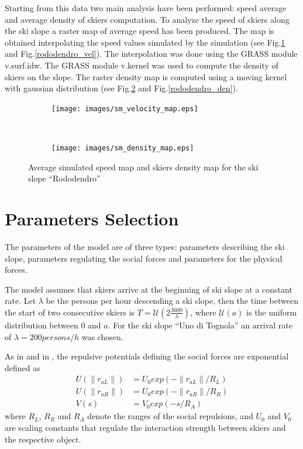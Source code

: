 \documentclass[12pt,a4paper,twoside]{book}
\newcommand{\norm}[1]{\lVert#1\rVert}
\begin{document}
Starting from this data two main analysis have been performed: speed average and average density of skiers computation. To analyze the speed of skiers along the ski slope a raster map of average speed has been produced. The map is obtained interpolating the speed values simulated by the simulation (see Fig.\ref{uno_tognola_vel} and Fig.\ref{rododendro_vel}). The interpolation was done using the GRASS module v.surf.idw. The GRASS module v.kernel was used to compute the density of skiers on the slope. The raster density map is computed using a moving kernel with gaussian distribution (see Fig.\ref{uno_tognola_den} and Fig.\ref{rododendro_den}).

\begin{figure}
        \centering
        \begin{subfigure}[b]{0.5\textwidth}
                \centering
                \texttt{[image: images/sm\_velocity\_map.eps]}
                \caption{}\label{uno_tognola_vel}
        \end{subfigure}%
        ~ %
        \begin{subfigure}[b]{0.5\textwidth}
                \centering
                \texttt{[image: images/sm\_density\_map.eps]}
                \caption{}\label{uno_tognola_den}
        \end{subfigure}
        \caption{Average simulated speed map and skiers density map for the ski slope ``Rododendro''}\label{uno_tognola}
\end{figure}

\section{Parameters Selection}
The parameters of the model are of three types: parameters describing the ski slope, parameters regulating the social forces and parameters for the physical forces.

The model assumes that skiers arrive at the beginning of ski slope at a constant rate. Let $\lambda$ be the persons per hour descending a ski slope, then the time between the start of two consecutive skiers is $T=\mathcal{U}\left(2\frac{3600}{\lambda}\right)$, where $\mathcal{U}(a)$ is the uniform distribution between $0$ and $a$. For the ski slope ``Uno di Tognola'' an arrival rate of $\lambda=200 persons/h$ was chosen.

As in \cite{hol2012} and in \cite{hel2008}, the repulsive potentials defining the social forces are exponential defined as
\begin{align}
U(\norm{r_{aL}})&=U_0 exp(-\norm{r_{aL}}/R_L) \\
U(\norm{r_{aR}})&=U_0 exp(-\norm{r_{aR}}/R_R) \\
V(s)&=V_0 exp(-s/R_A)
\end{align}
where $R_L$, $R_R$ and $R_A$ denote the ranges of the social repulsions, and $U_0$ and $V_0$ are scaling constants that regulate the interaction strength between skiers and the respective object.
\end{document}
